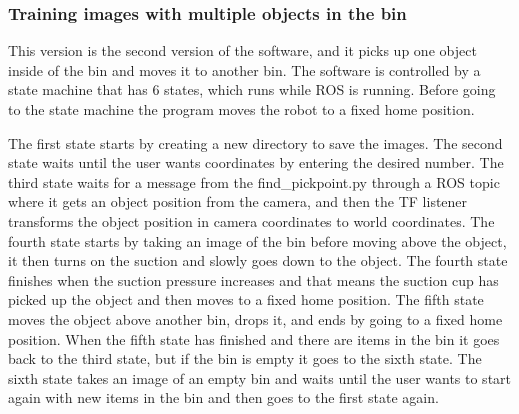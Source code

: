 \subsubsection{Training images with multiple objects in the bin}
This version is the second version of the software, and it picks up one object inside of the bin and moves it to another bin.
The software is controlled by a state machine that has 6 states, which runs while ROS is running. Before going to the state machine the program moves the robot to a fixed home position. 

The first state starts by creating a new directory to save the images. 
The second state waits until the user wants coordinates by entering the desired number. 
The third state waits for a message from the find\_pickpoint.py through a ROS topic where it gets an object position from the camera, and then the TF listener transforms the object position in camera coordinates to world coordinates.
The fourth state starts by taking an image of the bin before moving above the object, it then turns on the suction and slowly goes down to the object.  The fourth state finishes when the suction pressure increases and that means the suction cup has picked up the object and then moves to a fixed home position.
The fifth state moves the object above another bin, drops it, and ends by going to a fixed home position. When the fifth state has finished and there are items in the bin it goes back to the third state, but if the bin is empty it goes to the sixth state.
The sixth state takes an image of an empty bin and waits until the user wants to start
again with new items in the bin and then goes to the first state again. 


